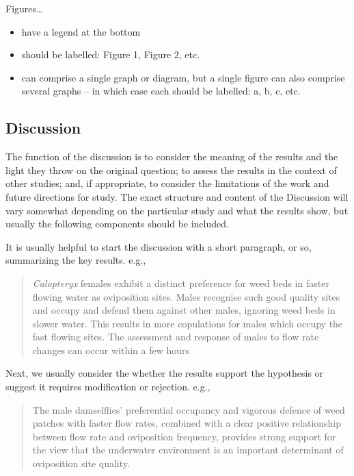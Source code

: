 \documentclass[
]{book}
\begin{document}
Figures\ldots{}

\begin{itemize}
\item
  have a legend at the bottom
\item
  should be labelled: Figure 1, Figure 2, etc.
\item
  can comprise a single graph or diagram, but a single figure can also comprise several graphs -- in which case each should be labelled: a, b, c, etc.
\end{itemize}

\hypertarget{discussion}{%
\subsection{Discussion}\label{discussion}}

The function of the discussion is to consider the meaning of the results and the light they throw on the original question; to assess the results in the context of other studies; and, if appropriate, to consider the limitations of the work and future directions for study. The exact structure and content of the Discussion will vary somewhat depending on the particular study and what the results show, but usually the following components should be included.

It is usually helpful to start the discussion with a short paragraph, or so, summarizing the key results. e.g.,

\begin{quote}
\emph{Calopteryx} females exhibit a distinct preference for weed beds in faster flowing water as oviposition sites. Males recognise such good quality sites and occupy and defend them against other males, ignoring weed beds in slower water. This results in more copulations for males which occupy the fast flowing sites. The assessment and response of males to flow rate changes can occur within a few hours
\end{quote}

Next, we usually consider the whether the results support the hypothesis or suggest it requires modification or rejection. e.g.,

\begin{quote}
The male damselflies' preferential occupancy and vigorous defence of weed patches with faster flow rates, combined with a clear positive relationship between flow rate and oviposition frequency, provides strong support for the view that the underwater environment is an important determinant of oviposition site quality.
\end{quote}
\end{document}
